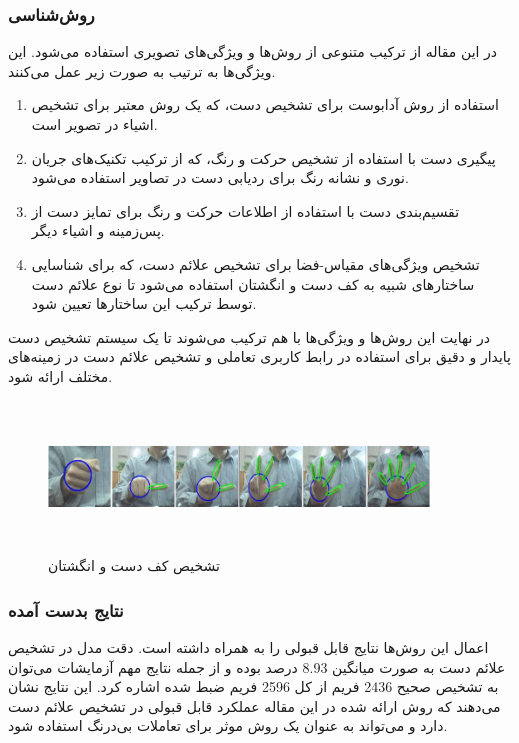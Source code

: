 \subsubsection{روش‌شناسی}
در  این مقاله از ترکیب متنوعی از روش‌ها و ویژگی‌های تصویری استفاده می‌شود. این ویژگی‌ها به ترتیب به صورت زیر عمل می‌کنند.
\begin{enumerate}
    \item استفاده از روش آدابوست
    برای تشخیص دست، که یک روش معتبر برای تشخیص اشیاء در تصویر است.
    \item پیگیری دست با استفاده از تشخیص حرکت و رنگ، که از ترکیب تکنیک‌های جریان نوری و نشانه رنگ برای ردیابی دست در تصاویر استفاده می‌شود.
    \item تقسیم‌بندی دست با استفاده از اطلاعات حرکت و رنگ برای تمایز دست از پس‌زمینه و اشیاء دیگر. 
    \item تشخیص ویژگی‌های مقیاس-فضا برای تشخیص علائم دست، که برای شناسایی ساختارهای شبیه به کف دست و انگشتان استفاده می‌شود تا نوع علائم دست توسط ترکیب این ساختارها تعیین شود.
\end{enumerate}
  در نهایت این روش‌ها و ویژگی‌ها با هم ترکیب می‌شوند تا یک سیستم تشخیص دست پایدار و دقیق برای استفاده در رابط کاربری تعاملی و تشخیص علائم دست در زمینه‌های مختلف ارائه شود.

\begin{figure}[h]
    \centering
    \includegraphics[height=4cm,width=0.9\textwidth]{hand_gesture_feature.png}
    \caption[تشخیص کف دست و انگشتان]{تشخیص کف دست و انگشتان \cite{fang2007real}}
\end{figure}

\subsubsection{نتایج بدست آمده}
اعمال این روش‌ها نتایج قابل قبولی را به همراه داشته است. دقت مدل در تشخیص علائم دست به صورت میانگین 8.93 درصد بوده و از جمله نتایج مهم آزمایشات می‌توان به تشخیص 
صحیح 2436 فریم از کل 2596 فریم ضبط شده اشاره کرد. این نتایج نشان می‌دهند که روش ارائه شده در این مقاله عملکرد قابل قبولی در تشخیص علائم دست دارد و 
می‌تواند به عنوان یک روش موثر برای تعاملات بی‌درنگ استفاده شود.



